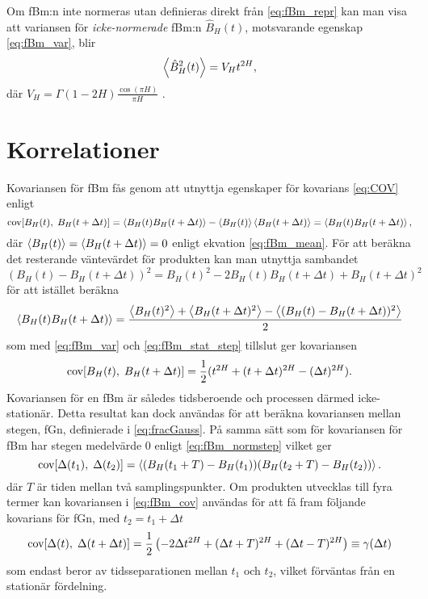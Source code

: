 Om fBm:n inte normeras utan definieras direkt från \eqref{eq:fBm_repr} kan man visa att \cite{Dieker_fBm} variansen för \emph{icke-normerade} fBm:n $\hat{B}_H(t)$, motsvarande egenskap \eqref{eq:fBm_var}, blir 
\begin{equation} \label{eq:fBm_onorm_var}
    \ev{\hat{B}^2_H(t)} = V_H t^{2H},
\end{equation}
där $V_H = \Gamma(1-2H)\frac{\cos(\pi H)}{\pi H}$ \cite{Flandrin_fBmspektrum1989}.


\section{Korrelationer}

Kovariansen för fBm fås genom att utnyttja egenskaper för kovarians \eqref{eq:COV} enligt
\begin{equation}
    \COV{B_H(t)}{B_H(t+\Delta{t})}=\ev{B_H(t)B_H(t+\Delta{t})}-\ev{B_H(t)}\ev{B_H(t+\Delta{t})}=\ev{B_H(t)B_H(t+\Delta{t})},
\end{equation}
där $\ev{B_H(t)}=\ev{B_H(t+\Delta{t})}=0$ enligt ekvation \eqref{eq:fBm_mean}. För att beräkna det resterande väntevärdet för produkten kan man utnyttja sambandet $(B_H(t)-B_H(t+\Delta{t}))^2=B_H(t)^2 -2B_H(t)B_H(t+\Delta{t})+B_H(t+\Delta{t})^2$ för att istället beräkna
\begin{equation}
    \ev{B_H(t)B_H(t+\Delta{t})}
    =\frac{
    \ev{B_H(t)^2} + \ev{B_H(t+\Delta{t})^2} - \ev{(B_H(t)-B_H(t+\Delta{t}))^2}
    }{2}
\end{equation}
som med \eqref{eq:fBm_var} och \eqref{eq:fBm_stat_step} tillslut ger kovariansen
\begin{equation} \label{eq:fBm_cov}
    \text{cov}\!\left[B_H(t),\;B_H(t+\Delta{t})\right] = \frac{1}{2}(t^{2H}+(t+\Delta{t})^{2H}-(\Delta{t})^{2H}).
\end{equation}
Kovariansen för en fBm är således tidsberoende och processen därmed icke-stationär. Detta resultat kan dock användas för att beräkna kovariansen mellan stegen, fGn, definierade i \eqref{eq:fracGauss}. På samma sätt som för kovariansen för fBm har stegen medelvärde 0 enligt  \eqref{eq:fBm_normstep} vilket ger
\begin{equation}
    \COV{\Delta(t_1)}{\Delta(t_2)} = \ev{(B_H(t_1+T)-B_H(t_1))(B_H(t_2+T)-B_H(t_2))}.
\end{equation}
där $T$ är tiden mellan två samplingspunkter. Om produkten utvecklas till fyra termer kan kovariansen i \eqref{eq:fBm_cov} användas för att få fram följande kovarians för fGn, med $t_2=t_1+\Delta{t}$
\begin{equation} \label{eq:fGn_cov}
    \text{cov}\!\left[\Delta(t),\;\Delta(t+\Delta{t})\right] = \frac{1}{2}\left(-2\Delta{t}^{2H}+(\Delta{t}+T)^{2H}+(\Delta{t}-T)^{2H}\right) \equiv \gamma(\Delta{t})
\end{equation}
som endast beror av tidsseparationen mellan $t_1$ och $t_2$, vilket förväntas från en stationär fördelning.


